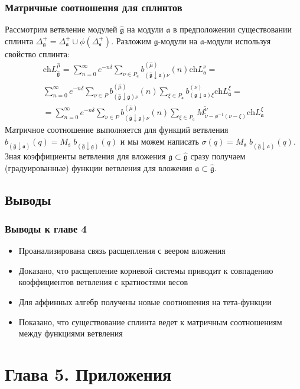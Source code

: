 \documentclass[pdftex]{beamer}
\newcommand{\gf}{\mathfrak{g}}
\newcommand{\gfh}{\hat{\mathfrak{g}}}
\newcommand{\af}{\mathfrak{a}}
\newcommand{\sfr}{\mathfrak{s}}
\theoremstyle{definition} \newtheorem{Def}{Определение}
\begin{document}
\begin{frame}
    \frametitle{Матричные соотношения для сплинтов}
Рассмотрим ветвление модулей  $\gfh$ на модули $\af$ в предположении существовании сплинта
$\Delta^{+}_{\gf}=\Delta^{+}_{\af}\cup \phi(\Delta^{+}_{\sfr})$.
Разложим  $\gf$-модули на 
$\af$-модули используя свойство сплинта:
\begin{multline}
  \label{eq:125}
  \mathrm{ch}L^{\hat{\mu}}_{\gfh}=
\sum_{n=0}^{\infty}e^{-n\delta} \sum_{\nu\in P_{\af}} b^{(\hat{\mu})}_{(\gfh\downarrow\af)\nu}(n) \mathrm{ch} L^{\nu}_{\af}=\\
\sum_{n=0}^{\infty} e^{-n\delta} \sum_{\nu\in P} b^{(\hat{\mu})}_{(\gfh\downarrow\gf )\nu}(n) \sum_{\xi\in P_{\af}} b^{(\nu)}_{(\gf\downarrow \af) \xi}\mathrm{ch} L^{\xi}_{\af}=\\
=\sum_{n=0}^{\infty} e^{-n\delta} \sum_{\nu\in P} b^{(\hat{\mu})}_{(\gfh\downarrow\gf )\nu}(n) \sum_{\xi\in P_{\af}} M^{\widetilde{\nu}}_{  \widetilde{\nu}-\phi^{-1}( \nu-\xi )}\mathrm{ch} L^{\xi}_{\af}
\end{multline}
  Матричное соотношение выполняется для функций ветвления $b_{(\gfh\downarrow\af)}(q)= M_{\sfr}\;
b_{(\gfh\downarrow\gf)}(q)$ и мы можем написать
$\sigma(q)=M_{\af}\; b_{(\gfh\downarrow\af)}(q)$.  Зная коэффициенты ветвления для вложения $\gf\subset\gfh$  сразу получаем (градуированные) функции ветвления для вложения $\af\subset \gfh$.
\end{frame}
\subsection{Выводы}
\begin{frame}
  \frametitle{Выводы к главе 4}
  \begin{itemize}
  \item Проанализирована связь расщепления с веером вложения
  \item Доказано, что расщепление корневой системы приводит к совпадению коэффициентов ветвления с кратностями весов
  \item Для аффинных алгебр получены новые соотношения на тета-функции
  \item Показано, что существование сплинта ведет к матричным соотношениям между функциями ветвления 
  \end{itemize}
\end{frame}
\section{Глава 5. Приложения}
\label{sec:applications}
\end{document}
